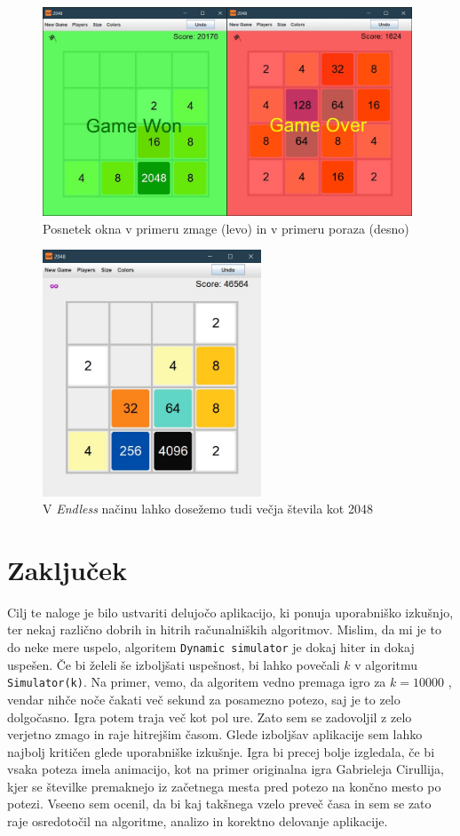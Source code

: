 \documentclass{article}
\begin{document}
\begin{figure}[ht!]
\centering
\includegraphics[width=11cm]{scr3.png}
\caption{Posnetek okna v primeru zmage (levo) in v primeru poraza (desno)}
\label{scr3}
\end{figure}

\begin{figure}[ht!]
\centering
\includegraphics[width=6.5cm]{scr4.jpg}
\caption{V \emph{Endless} načinu lahko dosežemo tudi večja števila kot 2048}
\label{scr4}
\end{figure}


\section{Zaključek}

Cilj te naloge je bilo ustvariti delujočo aplikacijo, ki ponuja uporabniško izkušnjo, ter nekaj različno dobrih in hitrih računalniških algoritmov. Mislim, da mi je to do neke mere uspelo, algoritem \texttt{Dynamic simulator} je dokaj hiter in dokaj uspešen. Če bi želeli še izboljšati uspešnost, bi lahko povečali $k$ v algoritmu \texttt{Simulator(k)}. Na primer, vemo, da algoritem vedno premaga igro za $k=10000$ \cite{stackoverflow}, vendar nihče noče čakati več sekund za posamezno potezo, saj je to zelo dolgočasno. Igra potem traja več kot pol ure. Zato sem se zadovoljil z zelo verjetno zmago in raje hitrejšim časom. Glede izboljšav aplikacije sem lahko najbolj kritičen glede uporabniške izkušnje. Igra bi precej bolje izgledala, če bi vsaka poteza imela animacijo, kot na primer originalna igra Gabrieleja Cirullija, kjer se številke premaknejo iz začetnega mesta pred potezo na končno mesto po potezi. Vseeno sem ocenil, da bi kaj takšnega vzelo preveč časa in sem se zato raje osredotočil na algoritme, analizo in korektno delovanje aplikacije.



\end{document}
